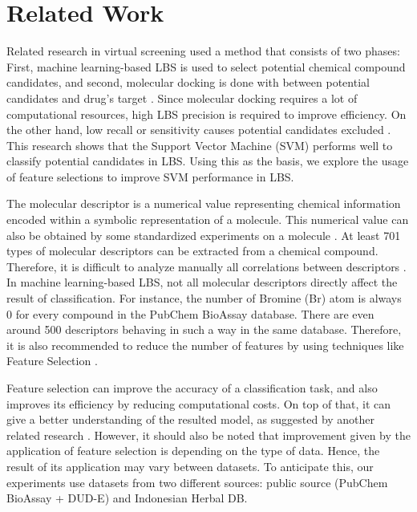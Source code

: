 \documentclass[conference]{IEEEtran}
\begin{document}
\section{Related Work}

Related research in virtual screening used a method that consists of two phases: First, machine learning-based LBS is used to select potential chemical compound candidates, and second, molecular docking is done with between potential candidates and drug's target \cite{hilman2012analisis}. Since molecular docking requires a lot of computational resources, high LBS precision is required to improve efficiency. On the other hand, low recall or sensitivity causes potential candidates excluded \cite{korkmaz2014drug}. This research shows that the Support Vector Machine (SVM) performs well to classify potential candidates in LBS. Using this as the basis, we explore the usage of feature selections to improve SVM performance in LBS.

The molecular descriptor is a numerical value representing chemical information encoded within a symbolic representation of a molecule. This numerical value can also be obtained by some standardized experiments on a molecule \cite{yap2011padel}. At least 701 types of molecular descriptors can be extracted from a chemical compound. Therefore, it is difficult to analyze manually all correlations between descriptors \cite{korkmaz2014drug}. In machine learning-based LBS, not all molecular descriptors directly affect the result of classification. For instance, the number of Bromine (Br) atom is always 0 for every compound in the PubChem BioAssay database. There are even around 500 descriptors behaving in such a way in the same database. Therefore, it is also recommended to reduce the number of features by using techniques like Feature Selection \cite{korkmaz2014drug}.

Feature selection can improve the accuracy of a classification task, and also improves its efficiency by reducing computational costs. On top of that, it can give a better understanding of the resulted model, as suggested by another related research \cite{janecek2008relationship}. However, it should also be noted that improvement given by the application of feature selection is depending on the type of data. Hence, the result of its application may vary between datasets\cite{janecek2008relationship}. To anticipate this, our experiments use datasets from two different sources: public source (PubChem BioAssay + DUD-E) and Indonesian Herbal DB.
\end{document}
